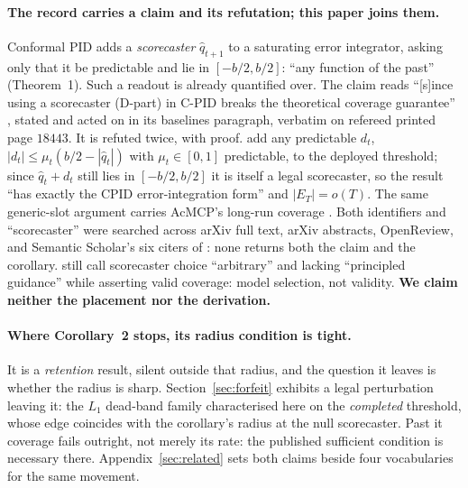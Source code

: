 \paragraph{The record carries a claim and its refutation; this paper joins them.} Conformal PID \citep{angelopoulos2023pid}
adds a \emph{scorecaster} $\hat{q}_{t+1}$ to a saturating error integrator, asking only that it
be predictable and lie in $[-b/2,b/2]$: ``any function of the past'' (Theorem~1). Such a readout
is already quantified over. The claim reads ``[s]ince using a scorecaster (D-part) in
C-PID breaks the theoretical coverage guarantee'' \citep{li2024neuralconformal}, stated and
acted on in its baselines paragraph, verbatim on refereed printed page $18443$. It is refuted
twice, with proof. \citet[Corollary~2]{li2025o2cp} add any predictable $d_t$, $|d_t| \le
\mu_t(b/2-|\hat{q}_t|)$ with $\mu_t \in [0,1]$ predictable, to the deployed threshold; since
$\hat{q}_t + d_t$ still lies in $[-b/2,b/2]$ it is itself a legal scorecaster, so the result
``has exactly the CPID error-integration form'' and $|E_T| = o(T)$. The same generic-slot argument
carries AcMCP's long-run coverage \citep{wang2026acmcp}. Both identifiers and ``scorecaster'' were
searched across arXiv full text, arXiv abstracts, OpenReview, and Semantic Scholar's six citers of
\mbox{\citet{li2024neuralconformal}}: none returns both the claim and the corollary.
\citet{hu2026distinformed} still call scorecaster choice ``arbitrary'' and lacking ``principled
guidance'' while asserting valid coverage: model selection, not validity. \textbf{We claim
neither the placement nor the derivation.}

\paragraph{Where Corollary~2 stops, its radius condition is tight.} It is a \emph{retention} result, silent
outside that radius, and the question it leaves is whether the radius is sharp.
Section~\ref{sec:forfeit} exhibits a legal perturbation leaving it: the $L_1$ dead-band family
characterised here on the \emph{completed} threshold, whose edge coincides with the corollary's
radius at the null scorecaster. Past it coverage fails outright, not merely its rate: the published
sufficient condition is necessary there. Appendix~\ref{sec:related} sets both claims beside four
vocabularies for the same movement.
